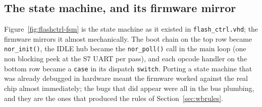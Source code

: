 \documentclass[a4paper,11pt]{article}
\begin{document}
\subsection{The state machine, and its firmware mirror}

Figure~\ref{fig:flashctrl-fsm} is the state machine as it existed in
\texttt{flash\_ctrl.vhd}; the firmware mirrors it almost mechanically. The boot
chain on the top row became \texttt{nor\_init()}, the IDLE hub became the
\texttt{nor\_poll()} call in the main loop (one non blocking peek at the S7 UART
per pass), and each opcode handler on the bottom row became a \texttt{case} in
its dispatch \texttt{switch}. Porting a state machine that was already debugged
in hardware meant the firmware worked against the real chip almost immediately;
the bugs that did appear were all in the bus plumbing, and they are the ones
that produced the rules of Section~\ref{sec:wbrules}.
\end{document}
